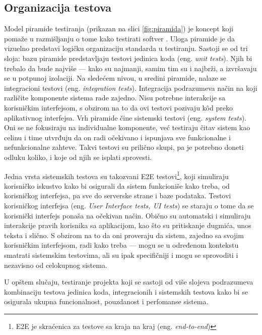 \documentclass[12pt,oneside]{memoir}
\begin{document}
\subsection{Organizacija testova}
\par Model piramide testiranja (prikazan na slici \ref{fig:piramida}) je koncept koji pomaže u razmišljanju o tome kako testirati softver \cite{cohn}. Uloga piramide je da vizuelno predstavi logičku organizaciju standarda u testiranju. Sastoji se od tri sloja: bazu piramide predstavljaju testovi jedinica koda (eng. \emph{unit tests}). Njih bi trebalo da bude najviše --- kako su najmanji, samim tim su i najbrži, a izvršavaju se u potpunoj izolaciji. Na sledećem nivou, u sredini piramide, nalaze se integracioni testovi (eng. \emph{integration tests}). Integracija podrazumeva način na koji različite komponente sistema rade zajedno. Nisu potrebne interakcije sa korisničkim interfejsom, s obzirom na to da ovi testovi pozivaju k\^{o}d preko aplikativnog interfejsa. Vrh piramide čine sistemski testovi (eng. \emph{system tests}). Oni se ne fokusiraju na individualne komponente, već testiraju čitav sistem kao celinu i time utvrđuju da on radi očekivano i ispunjava sve funkcionalne i nefunkcionalne zahteve. Takvi testovi su prilično skupi, pa je potrebno doneti odluku koliko, i koje od njih se isplati sprovesti.
\par Jedna vrsta sistemskih testova su takozvani E2E testovi\footnote{E2E je skraćenica za testove sa kraja na kraj (eng. \emph{end-to-end})}, koji simuliraju korisničko iskustvo kako bi osigurali da sistem funkcioniše kako treba, od korisničkog interfejsa, pa sve do serverske strane i baze podataka. Testovi korisničkog interfejsa (eng. \emph{User Interface tests, UI tests}) se staraju o tome da se korisnički interfejs ponaša na očekivan način. Obično su automatski i simuliraju interakcije pravih korisnika sa aplikacijom, kao što su pritiskanje dugmića, unos teksta i slično. S obzirom na to da oni proveraju da sistem, zajedno sa svojim korisničkim interfejsom, radi kako treba --- mogu se u određenom kontekstu smatrati sistemskim testovima, ali su ipak specifičniji i mogu se sprovoditi i nezavisno od celokupnog sistema. 
\par U opštem slučaju, testiranje projekta koji se sastoji od više slojeva podrazumeva kombinaciju testova jedinica koda, integracionih i sistemskih testova kako bi se osigurala ukupna funcionalnost, pouzdanost i perfomanse sistema.
\end{document}
